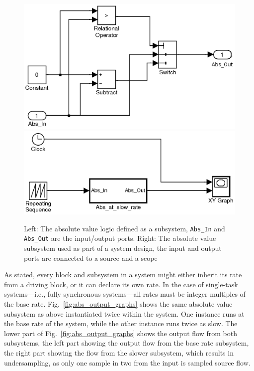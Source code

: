 \begin{figure}
\centering
\includegraphics[scale=0.5]{figs/abs_block_simulink}
\hspace{10mm}
\includegraphics[scale=0.5]{figs/subsystem_simulink}
\caption{Left: The absolute value logic defined as a subsystem,
  \texttt{Abs\_In} and \texttt{Abs\_Out} are the input/output
  ports. Right: The absolute value subsystem used as part of a system
  design, the input and output ports are connected to a source and a
  scope}
\label{fig:subsystem_simulink}
\end{figure}

As stated, every block and subsystem in a system might either inherit
its rate from a driving block, or it can declare its own rate. In the
case of single-task systems---i.e., fully synchronous systems---all
rates must be integer multiples of the base
rate. Fig.~\ref{fig:abs_output_graphs} shows the same absolute value
subsystem as above instantiated twice within the system. One instance
runs at the base rate of the system, while the other instance runs
twice as slow. The lower part of Fig.~\ref{fig:abs_output_graphs}
shows the output flow from both subsystems, the left part showing the
output flow from the base rate subsystem, the right part showing the
flow from the slower subsystem, which results in undersampling, as
only one sample in two from the input is sampled source flow.

